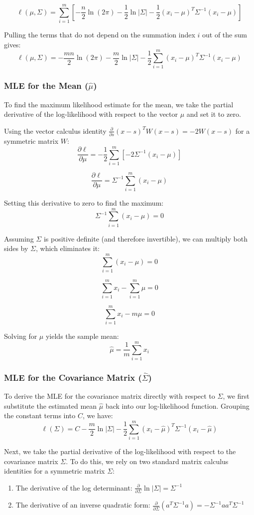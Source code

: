 \documentclass[twoside, 10pt]{article}
\begin{document}
\[
 \ell(\mu, \Sigma) = \sum_{i=1}^m \left[ -\frac{n}{2}\ln\left(2\pi\right) - \frac{1}{2}\ln\left|\Sigma\right| - \frac{1}{2}(x_i - \mu)^T\Sigma^{-1}(x_i - \mu) \right]
\]

Pulling the terms that do not depend on the summation index $i$ out of the sum gives:
\[
 \ell(\mu, \Sigma) = -\frac{mn}{2}\ln\left(2\pi\right) - \frac{m}{2}\ln\left|\Sigma\right| - \frac{1}{2}\sum_{i=1}^m (x_i - \mu)^T\Sigma^{-1}(x_i - \mu)
\]

\subsubsection{MLE for the Mean ($\hat{\mu}$)}
To find the maximum likelihood estimate for the mean, we take the partial derivative of the log-likelihood with respect to the vector $\mu$ and set it to zero.

Using the vector calculus identity $\frac{\partial}{\partial s} (x - s)^T W (x - s) = -2W(x - s)$ for a symmetric matrix $W$:
\[\frac{\partial \ell}{\partial \mu} = -\frac{1}{2} \sum_{i=1}^m \left[ -2\Sigma^{-1}(x_i - \mu) \right]\]

\[\frac{\partial \ell}{\partial \mu} = \Sigma^{-1} \sum_{i=1}^m (x_i - \mu)\]

Setting this derivative to zero to find the maximum:
\[
\Sigma^{-1} \sum_{i=1}^m (x_i - \mu) = 0
\]

Assuming $\Sigma$ is positive definite (and therefore invertible), we can multiply both sides by $\Sigma$, which eliminates it:
\[
\sum_{i=1}^m (x_i - \mu) = 0
\]

\[
\sum_{i=1}^m x_i - \sum_{i=1}^m \mu = 0
\]

\[
\sum_{i=1}^m x_i - m\mu = 0
\]

Solving for $\mu$ yields the sample mean:
\[
\hat{\mu} = \frac{1}{m}\sum_{i=1}^m x_i
\]

\subsubsection{MLE for the Covariance Matrix ($\hat{\Sigma}$)}
To derive the MLE for the covariance matrix directly with respect to $\Sigma$, we first substitute the estimated mean $\hat{\mu}$ back into our log-likelihood function. Grouping the constant terms into $C$, we have:
\[\ell(\Sigma) = C - \frac{m}{2}\ln\left|\Sigma\right| - \frac{1}{2}\sum_{i=1}^m (x_i - \hat{\mu})^T\Sigma^{-1}(x_i - \hat{\mu})\]

Next, we take the partial derivative of the log-likelihood with respect to the covariance matrix $\Sigma$. To do this, we rely on two standard matrix calculus identities for a symmetric matrix $\Sigma$:
\begin{enumerate}
    \item The derivative of the log determinant: $\frac{\partial}{\partial \Sigma} \ln|\Sigma| = \Sigma^{-1}$
    \item The derivative of an inverse quadratic form: $\frac{\partial}{\partial \Sigma} (a^T \Sigma^{-1} a) = -\Sigma^{-1} a a^T \Sigma^{-1}$
\end{enumerate}
\end{document}
